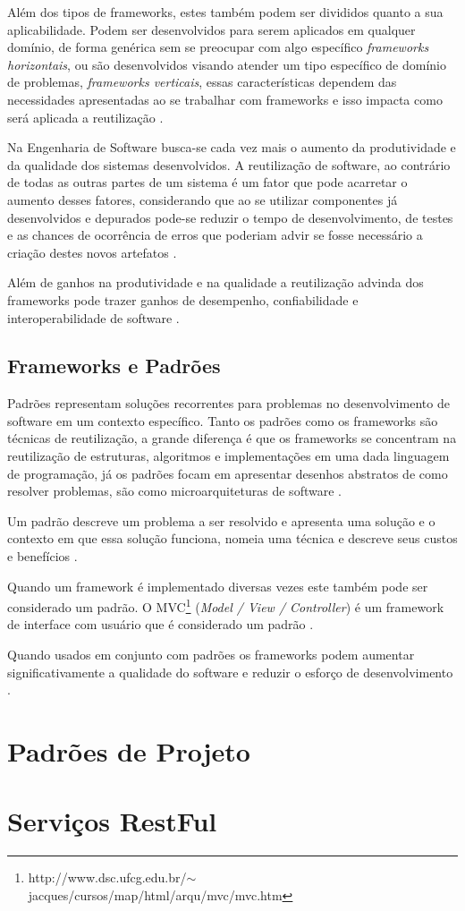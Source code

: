 Além dos tipos de frameworks, estes também podem ser divididos quanto a sua aplicabilidade. Podem ser desenvolvidos para serem aplicados em qualquer domínio, de forma genérica sem se preocupar com algo específico \textit{frameworks horizontais}, ou são desenvolvidos visando atender um tipo específico de domínio de problemas, \textit{frameworks verticais}, essas características dependem das necessidades apresentadas ao se trabalhar com frameworks e isso impacta como será aplicada a reutilização \cite{Kroth:2000}.

Na Engenharia de Software busca-se cada vez mais o aumento da produtividade e da qualidade dos sistemas desenvolvidos. A reutilização de software, ao contrário de todas as outras partes de um sistema é um fator que pode acarretar o aumento desses fatores, considerando que ao se utilizar componentes já desenvolvidos e depurados pode-se reduzir o tempo de desenvolvimento, de testes e as chances de ocorrência de erros que poderiam advir se fosse necessário a criação destes novos artefatos \cite{Silva:2000}.

Além de ganhos na produtividade e na qualidade a reutilização advinda dos frameworks pode trazer ganhos de desempenho, confiabilidade e interoperabilidade de software \cite{Fayad:Schimidt:1997}.

\subsection{Frameworks e Padrões}

Padrões representam soluções recorrentes para problemas no desenvolvimento de software em um contexto específico. Tanto os padrões como os frameworks são técnicas de reutilização, a grande diferença é que os frameworks 	se concentram na reutilização de estruturas, algoritmos e implementações em uma dada linguagem de programação, já os padrões focam em apresentar desenhos abstratos de como resolver problemas, são como microarquiteturas de software \cite{Fayad:Schimidt:1997}.

Um padrão descreve um problema a ser resolvido e apresenta uma solução e o contexto em que essa solução funciona, nomeia uma técnica e descreve seus custos e benefícios \cite{Johnson:1997}.

Quando um framework é implementado diversas vezes este também pode ser considerado um padrão. O MVC\footnote{http://www.dsc.ufcg.edu.br/$\sim$jacques/cursos/map/html/arqu/mvc/mvc.htm} (\textit{Model / View / Controller}) é um framework de interface com usuário que é considerado um padrão \cite{Johnson:1997}.

Quando usados em conjunto com padrões os frameworks podem aumentar significativamente a qualidade do software e reduzir o esforço de desenvolvimento \cite{Fayad:Schimidt:1997}.

\section{Padrões de Projeto}

\section{Serviços RestFul}